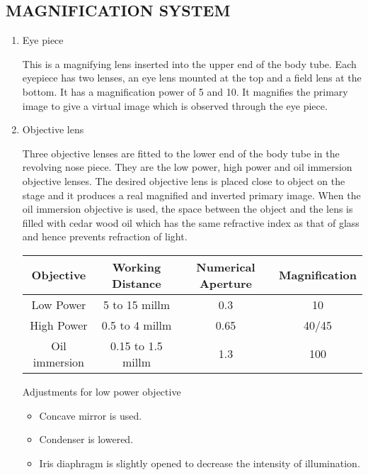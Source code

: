 \documentclass{book}
\begin{document}
						\subsection{MAGNIFICATION SYSTEM}
						\begin{enumerate}

						\item{Eye piece
							\par This is a magnifying lens inserted into the upper end of the body tube. Each eyepiece has two lenses, an eye lens mounted at the top and a field lens at the bottom. It has a magnification power of 5 and 10. It magnifies the primary image to give a virtual image which is observed through the eye piece.}
							\item{Objective lens

								\par Three objective lenses are fitted to the lower end of the body tube in the revolving nose piece. They are the low power, high power and oil immersion objective lenses. The desired objective lens is placed close to object on the stage and it produces a real magnified and inverted primary image. When the oil immersion objective is used, the space between the object and the lens is filled with cedar wood oil which has the same refractive index as that of glass and hence prevents refraction of light.\newline
									\begin{tabular}{c | c | c | c}
								\hline
									Objective & Working Distance & Numerical Aperture &Magnification\\
									\hline
									Low Power & 5 to 15 millm & 0.3 & 10\\
									\hline
									High Power
									&0.5 to 4 millm
									&0.65
									&40/45 \\
									\hline

									Oil immersion
									&0.15 to 1.5 millm
									&1.3
									&100 \\

									\hline





									\end{tabular}

								\par
									Adjustments for low power objective
									\begin{itemize}
								\item {Concave mirror is used.}
								\item {Condenser is lowered.}
								\item {Iris diaphragm is slightly opened to decrease the intensity of illumination.}
								\end{itemize}

}
\end{enumerate}
\end{document}

